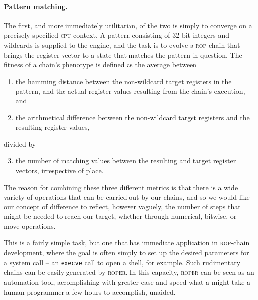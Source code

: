 \paragraph{Pattern matching.} The first, and more immediately
utilitarian, of the two is simply to converge on a precisely
specified \textsc{cpu} context. A pattern consisting of 32-bit
integers and wildcards is supplied to the engine, and the task is
to evolve a \textsc{rop}-chain that brings the register vector to
a state that matches the pattern in question. The fitness of a
chain's phenotype is defined as the average between
\begin{enumerate}
  
  \item the hamming distance between the non-wildcard target
    registers in the pattern, and the actual register values
    resulting from the chain's execution, and
  
  \item the arithmetical difference between the non-wildcard
    target registers and the resulting register values,

\end{enumerate} 
divided by 
\begin{enumerate}
    \setcounter{enumi}{2}
  \item the number of matching values between the resulting
and target register vectors, irrespective of place.
\end{enumerate}
The reason
for combining these three different metrics is that there is a
wide variety of operations that can be carried out by our chains,
and so we would like our concept of difference to reflect,
however vaguely, the number of steps that might be needed to
reach our target, whether through numerical, bitwise, or move
operations.

This is a fairly simple task, but one that has immediate
application in \textsc{rop}-chain development, where the goal is
often simply to set up the desired parameters for a system call
-- an \texttt{execve} call to open a shell, for example. Such
rudimentary chains can be easily generated by \textsc{roper}. 
In this capacity, \textsc{roper} can be seen as an automation
tool, accomplishing with greater ease and speed what a might take
a human programmer a few hours to accomplish, unaided. 

